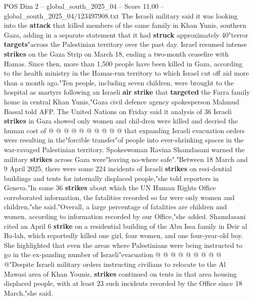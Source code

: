 \begin{textsample}{POS Dim 2 – global\_south\_2025\_04 – Score 11.00 – global\_south\_2025\_04/123497908.txt}
The Israeli military said it was looking into the \textbf{attack} that killed members of the same family in Khan Yunis, southern Gaza, adding in a separate statement that it had \textbf{struck} approximately 40"terror \textbf{targets}"across the Palestinian territory over the past day.
Israel resumed intense \textbf{strikes} on the Gaza Strip on March 18, ending a two-month ceasefire with Hamas.
Since then, more than 1,500 people have been killed in Gaza, according to the health ministry in the Hamas-run territory to which Israel cut off aid more than a month ago."Ten people, including seven children, were brought to the hospital as martyrs following an Israeli \textbf{air} \textbf{strike} that \textbf{targeted} the Farra family home in central Khan Yunis,"Gaza civil defence agency spokesperson Mahmud Bassal told AFP.
The United Nations on Friday said it analysis of 36 Israeli \textbf{strikes} in Gaza showed only women and chil-dren were killed and decried the human cost of @ @ @ @ @ @ @ @ @ @ that expanding Israeli evacuation orders were resulting in the"forcible transfer"of people into ever-shrinking spaces in the war-ravaged Palestinian territory.
Spokeswoman Ravina Shamdasani warned the military \textbf{strikes} across Gaza were"leaving no-where safe"."Between 18 March and 9 April 2025, there were some 224 incidents of Israeli \textbf{strikes} on resi-dential buildings and tents for internally displaced people,"she told reporters in Geneva."In some 36 \textbf{strikes} about which the UN Human Rights Office corroborated information, the fatalities recorded so far were only women and children,"she said."Overall, a large percentage of fatalities are children and women, according to information recorded by our Office,"she added.
Shamdasani cited an April 6 \textbf{strike} on a residential building of the Abu Issa family in Deir al Ba-lah, which reportedly killed one girl, four women, and one four-year-old boy.
She highlighted that even the areas where Palestinians were being instructed to go in the ex-panding number of Israeli"evacuation @ @ @ @ @ @ @ @ @ @"Despite Israeli military orders instructing civilians to relocate to the Al Mawasi area of Khan Younis, \textbf{strikes} continued on tents in that area housing displaced people, with at least 23 such incidents recorded by the Office since 18 March,"she said.

\end{textsample}
